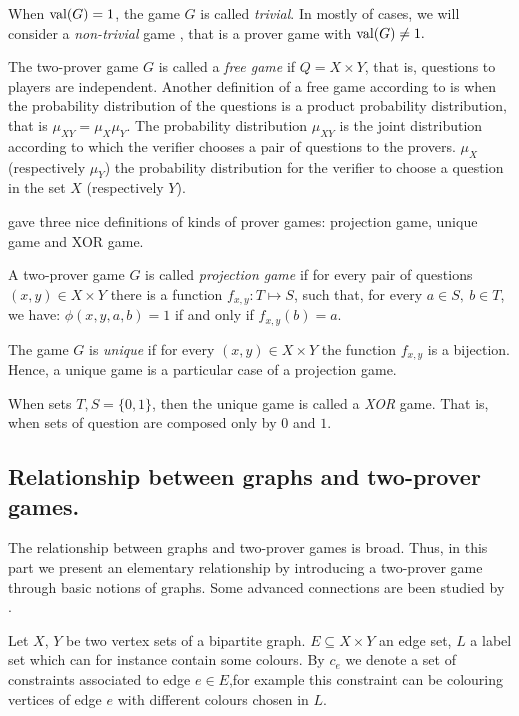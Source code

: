 When $\mathrm{val} (G)=1$, the game $G$ is called \textit{trivial}. In mostly of cases, we will consider a \textit{non-trivial} game , that is a prover game with $\mathrm{val} (G) \neq 1.$

The two-prover game $G$ is called a \textit{free game} if $Q=X \times Y$, that is, questions to players are  independent. Another definition of a free game according to \cite*{barak2009strong} is when  the probability  distribution of the questions is a product probability  distribution, that is $\mu_{XY}=\mu_X \mu_Y.$ The probability distribution $\mu_{XY}$ is  the joint distribution according to which the verifier chooses a pair of questions to the provers. $\mu_X$ (respectively  $\mu_Y$) the probability distribution for the verifier to choose a question in the set $X$ (respectively $Y$).

\cite{raz2010parallel} gave three nice definitions of kinds of prover games: projection game, unique game and XOR game.

A two-prover game $G$ is called \textit{projection game} if for every pair of questions $(x,y) \in X \times Y$ there is a function $f_{x,y}: T \longmapsto S$, such that, for every $a\in S, \ b\in T$, we have: $\phi(x,y,a,b)=1$ if and only if $f_{x,y}(b)=a.$ 

The game $G$ is \textit{unique} if for every $(x,y) \in X \times Y$ the function $f_{x,y}$ is a bijection. Hence, a unique game is a particular case of a projection game. 

When sets $T, S = \{0, 1\}$, then the unique game is called a \textit{XOR} game. That is, when sets of question are composed only by $0$ and $1.$

\subsection{Relationship between graphs and two-prover games.} \label{expander}

The relationship between graphs and two-prover games is broad. Thus, in this part we present an elementary  relationship by introducing a two-prover game through basic notions of graphs. Some advanced connections are been studied by  \cite*{laekhanukit2014parameters,tamaki2015parallel,dinur2016multiplayer}.

Let $X$, $Y$ be two vertex sets of a bipartite graph. $E\subseteq X \times Y$ an edge set, $L$ a label set which can for instance contain some colours. By $c_e$ we denote a set of constraints associated to edge $e \in E$,for example  this constraint can be colouring vertices of edge $e$ with different colours chosen in $L$.


